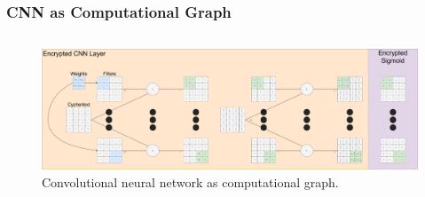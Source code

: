 \documentclass[aspectratio=169]{beamer}
\begin{document}
  \begin{frame}
    \frametitle{CNN as Computational Graph}
    \begin{columns}
      \begin{column}{1\textwidth}
        \begin{figure}[th!]
          \centering
          \includegraphics[width=1\textwidth]{cnn_computational_graph.pdf}
          \caption{Convolutional neural network as computational graph. \autocite{repository}}
          \label{fig:cnn_computational_graph}
        \end{figure}
      \end{column}
    \end{columns}
  \end{frame}
\end{document}
